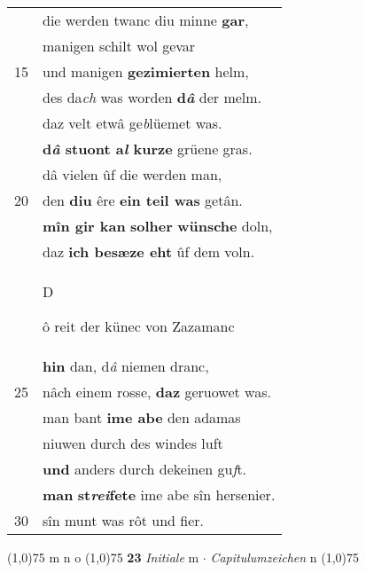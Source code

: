 \documentclass[8pt,a4paper,notitlepage]{article}
\begin{document}
\begin{table}[ht]
\begin{minipage}[t]{0.5\linewidth}
\begin{tabular}{rl}
 & die werden twanc diu minne \textbf{gar},\\ 
 & manigen schilt wol gevar\\ 
15 & und manigen \textbf{gezimierten} helm,\\ 
 & des da\textit{ch} was worden \textbf{d\textit{â}} der melm.\\ 
 & daz velt etwâ ge\textit{b}lüemet was.\\ 
 & \textbf{d\textit{â} stuont a\textit{l} kurze} grüene gras.\\ 
 & dâ vielen ûf die werden man,\\ 
20 & den \textbf{diu} êre \textbf{ein teil was} getân.\\ 
 & \textbf{mîn gir kan} \textbf{solher} \textbf{wünsche} doln,\\ 
 & daz \textbf{ich besæze eht} ûf dem voln.\\ 
 & \begin{large}D\end{large}ô reit der künec von Zazamanc\\ 
 & \textbf{hin} dan, d\textit{â} niemen dranc,\\ 
25 & nâch einem rosse, \textbf{daz} geruowet was.\\ 
 & man bant \textbf{ime abe} den adamas\\ 
 & niuwen durch des windes luft\\ 
 & \textbf{und} anders durch dekeinen gu\textit{f}t.\\ 
 & \textbf{man} \textbf{st\textit{rei}fete} ime abe sîn hersenier.\\ 
30 & sîn munt was rôt und fier.\\ 
\end{tabular}
\scriptsize
\line(1,0){75} \newline
m n o \newline
\line(1,0){75} \newline
\textbf{23} \textit{Initiale} m   $\cdot$ \textit{Capitulumzeichen} n  \newline
\line(1,0){75} \newline

\end{minipage}
\end{table}
\end{document}
